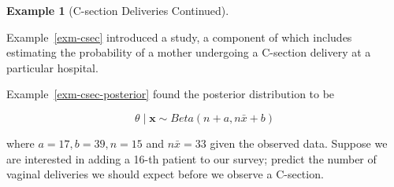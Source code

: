 \documentclass[
  letterpaper,
  DIV=11,
  numbers=noendperiod]{scrreprt}
\theoremstyle{definition}
\theoremstyle{plain}
\theoremstyle{definition}
\newtheorem{example}{Example}[chapter]
\theoremstyle{remark}
\begin{document}
\begin{example}[C-section Deliveries
Continued]\protect\hypertarget{exm-csec-prediction}{}\label{exm-csec-prediction}

Example~\ref{exm-csec} introduced a study, a component of which includes
estimating the probability of a mother undergoing a C-section delivery
at a particular hospital.

Example~\ref{exm-csec-posterior} found the posterior distribution to be

\[\theta \mid \mathbf{x} \sim Beta\left(n + a, n\bar{x} + b\right)\]

where \(a = 17, b = 39, n = 15\) and \(n\bar{x} = 33\) given the
observed data. Suppose we are interested in adding a 16-th patient to
our survey; predict the number of vaginal deliveries we should expect
before we observe a C-section.

\end{example}
\end{document}
